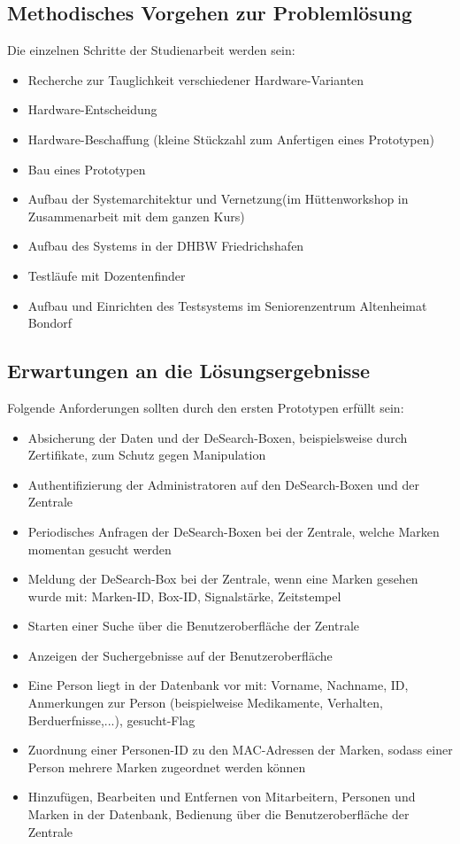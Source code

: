 \subsection{Methodisches Vorgehen zur Problemlösung}
Die einzelnen Schritte der Studienarbeit werden sein:
\begin{itemize}
\item Recherche zur Tauglichkeit verschiedener Hardware-Varianten
\item Hardware-Entscheidung
\item Hardware-Beschaffung (kleine Stückzahl zum Anfertigen eines Prototypen)
\item Bau eines Prototypen
\item Aufbau der Systemarchitektur und Vernetzung(im Hüttenworkshop in Zusammenarbeit mit dem ganzen Kurs)
\item Aufbau des Systems in der DHBW Friedrichshafen
\item Testläufe mit Dozentenfinder
\item Aufbau und Einrichten des Testsystems im Seniorenzentrum Altenheimat Bondorf
\end{itemize}



\subsection{Erwartungen an die Lösungsergebnisse}
Folgende Anforderungen sollten durch den ersten Prototypen erfüllt sein:
\begin{itemize}
	\item  Absicherung der Daten und der DeSearch-Boxen, beispielsweise durch Zertifikate, zum Schutz gegen Manipulation
	\item Authentifizierung der Administratoren auf den DeSearch-Boxen und der Zentrale 
	\item Periodisches Anfragen der DeSearch-Boxen bei der Zentrale, welche Marken momentan gesucht werden
	\item Meldung der DeSearch-Box bei der Zentrale, wenn eine Marken gesehen wurde mit: Marken-ID, Box-ID, Signalstärke, Zeitstempel
	\item Starten einer Suche über die Benutzeroberfläche der Zentrale
	\item Anzeigen der Suchergebnisse auf der Benutzeroberfläche
	\item Eine Person liegt in der Datenbank vor mit: Vorname, Nachname, ID, Anmerkungen zur Person (beispielweise Medikamente, Verhalten, Berduerfnisse,...), gesucht-Flag
	\item Zuordnung einer Personen-ID zu den MAC-Adressen der Marken, sodass einer Person mehrere Marken zugeordnet werden können
	\item Hinzufügen, Bearbeiten und Entfernen von Mitarbeitern, Personen und Marken in der Datenbank, Bedienung über die Benutzeroberfläche der Zentrale
\end{itemize}

